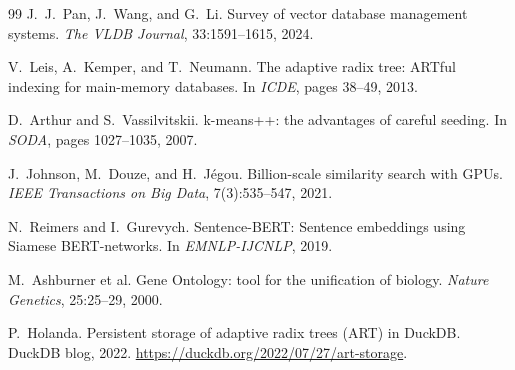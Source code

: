 \begin{thebibliography}{99}
 J.~J.~Pan, J.~Wang, and G.~Li. Survey of vector database management systems. \emph{The VLDB Journal}, 33:1591--1615, 2024.

 V.~Leis, A.~Kemper, and T.~Neumann. The adaptive radix tree: ARTful indexing for main-memory databases. In \emph{ICDE}, pages 38--49, 2013.

 D.~Arthur and S.~Vassilvitskii. k-means++: the advantages of careful seeding. In \emph{SODA}, pages 1027--1035, 2007.

 J.~Johnson, M.~Douze, and H.~J\'egou. Billion-scale similarity search with GPUs. \emph{IEEE Transactions on Big Data}, 7(3):535--547, 2021.

 N.~Reimers and I.~Gurevych. Sentence-BERT: Sentence embeddings using Siamese BERT-networks. In \emph{EMNLP-IJCNLP}, 2019.

 M.~Ashburner et al. Gene Ontology: tool for the unification of biology. \emph{Nature Genetics}, 25:25--29, 2000.

 P.~Holanda. Persistent storage of adaptive radix trees (ART) in DuckDB. DuckDB blog, 2022. \url{https://duckdb.org/2022/07/27/art-storage}.

\end{thebibliography}
